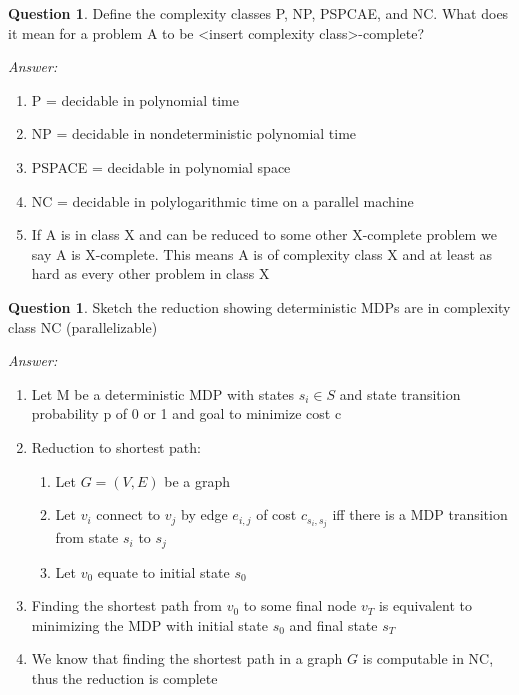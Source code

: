 \documentclass{article}
\theoremstyle{definition}
\newtheorem{question}[thm]{Question}
\newenvironment{answer}{\noindent\textit{Answer:}}{}
\begin{document}
\begin{question}
    Define the complexity classes P, NP, PSPCAE, and NC. What does it mean for a problem A to be <insert complexity class>-complete?
\end{question}

\begin{answer}
    \begin{enumerate}
        \item P = decidable in polynomial time
        \item NP = decidable in nondeterministic polynomial time
        \item PSPACE = decidable in polynomial space
        \item NC = decidable in polylogarithmic time on a parallel machine
        \item If A is in class X and can be reduced to some other X-complete problem we say A is X-complete. This means A is of complexity class X and at least as hard as every other problem in class X
    \end{enumerate}
\end{answer}

\begin{question}
Sketch the reduction showing deterministic MDPs are in complexity class NC (parallelizable)
\end{question}

\begin{answer}
    \begin{enumerate}
        \item Let M be a deterministic MDP with states $s_i \in S$ and state transition probability p of 0 or 1 and goal to minimize cost c
        \item Reduction to shortest path:
            \begin{enumerate}
                \item Let $G=(V,E)$ be a graph
                \item Let $v_i$ connect to $v_j$ by edge $e_{i,j}$ of cost $c_{s_i,s_j}$ iff there is a MDP transition from state $s_i$ to $s_j$ 
                \item Let $v_0$ equate to initial state $s_0$ 
            \end{enumerate}
        \item Finding the shortest path from $v_0$ to some final node $v_T$ is equivalent to minimizing the MDP with initial state $s_0$ and final state $s_T$
        \item We know that finding the shortest path in a graph $G$ is computable in NC, thus the reduction is complete
    \end{enumerate}
\end{answer}
\end{document}
